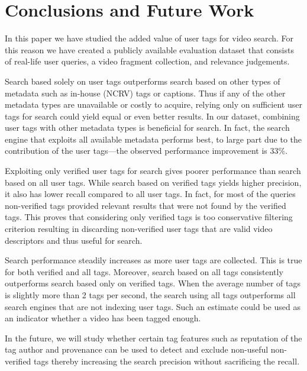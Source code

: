 \section{Conclusions and Future Work}\label{sec:conclusions}
In this paper we have studied the added value of user tags for video search. For this reason we have created a publicly available evaluation dataset that consists of real-life user queries, a video fragment collection, and relevance judgements. 

Search based solely on user tags outperforms search based on other types of metadata such as in-house (NCRV) tags or captions. Thus if any of the other metadata types are unavailable or costly to acquire, relying only on sufficient user tags for search could yield equal or even better results. In our dataset, combining user tags with other metadata types is beneficial for search. In fact, the search engine that exploits all available metadata performs best, to large part due to the contribution of the user tags---the observed performance improvement is 33\%. 

Exploiting only verified user tags for search gives poorer performance than search based on all user tags. While search based on verified tags yields higher precision, it also has lower recall compared to all user tags. In fact, for most of the queries non-verified tags provided relevant results that were not found by the verified tags. This proves that considering only verified tags is too conservative filtering criterion resulting in discarding non-verified user tags that are valid video descriptors and thus useful for search. 

Search performance steadily increases as more user tags are collected. This is true for both verified and all tags. Moreover, search based on all tags consistently outperforms search based only on verified tags. When the average number of tags is slightly more than 2 tags per second, the search using all tags outperforms all search engines that are not indexing user tags. Such an estimate could be used as an indicator whether a video has been tagged enough.

In the future, we will study whether certain tag features such as reputation of the tag author and provenance can be used to detect and exclude non-useful non-verified tags thereby increasing the search precision without sacrificing the recall. 
